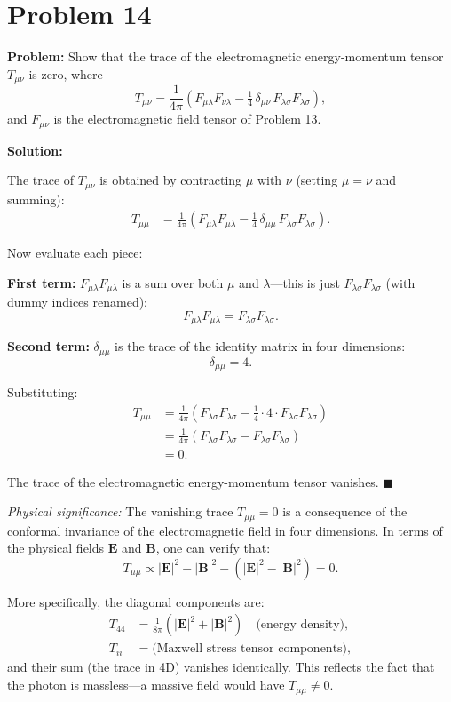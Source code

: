 \documentclass[12pt]{article}
\newcommand{\vect}[1]{\mathbf{#1}}
\begin{document}
\section*{Problem 14}

\textbf{Problem:} Show that the trace of the electromagnetic energy-momentum tensor $T_{\mu\nu}$ is zero, where
\[
T_{\mu\nu} = \frac{1}{4\pi}\!\left(F_{\mu\lambda}F_{\nu\lambda} - \tfrac{1}{4}\,\delta_{\mu\nu}\,F_{\lambda\sigma}F_{\lambda\sigma}\right),
\]
and $F_{\mu\nu}$ is the electromagnetic field tensor of Problem 13.

\bigskip
\textbf{Solution:}

The trace of $T_{\mu\nu}$ is obtained by contracting $\mu$ with $\nu$ (setting $\mu = \nu$ and summing):
\begin{align}
T_{\mu\mu} &= \frac{1}{4\pi}\!\left(F_{\mu\lambda}F_{\mu\lambda} - \tfrac{1}{4}\,\delta_{\mu\mu}\,F_{\lambda\sigma}F_{\lambda\sigma}\right).
\end{align}

Now evaluate each piece:

\textbf{First term:} $F_{\mu\lambda}F_{\mu\lambda}$ is a sum over both $\mu$ and $\lambda$---this is just $F_{\lambda\sigma}F_{\lambda\sigma}$ (with dummy indices renamed):
\[
F_{\mu\lambda}F_{\mu\lambda} = F_{\lambda\sigma}F_{\lambda\sigma}.
\]

\textbf{Second term:} $\delta_{\mu\mu}$ is the trace of the identity matrix in four dimensions:
\[
\delta_{\mu\mu} = 4.
\]

Substituting:
\begin{align}
T_{\mu\mu} &= \frac{1}{4\pi}\!\left(F_{\lambda\sigma}F_{\lambda\sigma} - \tfrac{1}{4}\cdot 4 \cdot F_{\lambda\sigma}F_{\lambda\sigma}\right) \\
&= \frac{1}{4\pi}\!\left(F_{\lambda\sigma}F_{\lambda\sigma} - F_{\lambda\sigma}F_{\lambda\sigma}\right) \\
&= \boxed{0}.
\end{align}

The trace of the electromagnetic energy-momentum tensor vanishes. \hfill $\blacksquare$

\bigskip
\textit{Physical significance:} The vanishing trace $T_{\mu\mu} = 0$ is a consequence of the conformal invariance of the electromagnetic field in four dimensions. In terms of the physical fields $\vect{E}$ and $\vect{B}$, one can verify that:
\[
T_{\mu\mu} \propto |\vect{E}|^2 - |\vect{B}|^2 - (|\vect{E}|^2 - |\vect{B}|^2) = 0.
\]

More specifically, the diagonal components are:
\begin{align}
T_{44} &= \frac{1}{8\pi}(|\vect{E}|^2 + |\vect{B}|^2) \quad \text{(energy density)}, \\
T_{ii} &= \text{(Maxwell stress tensor components)},
\end{align}
and their sum (the trace in 4D) vanishes identically. This reflects the fact that the photon is massless---a massive field would have $T_{\mu\mu} \neq 0$.
\end{document}
